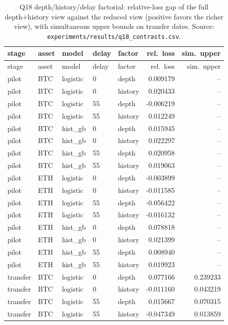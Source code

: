 \begin{longtable}{lllllrr}
\caption{Q18 depth/history/delay factorial: relative-loss gap of the full depth+history
view against the reduced view (positive favors the richer view), with simultaneous upper
bounds on transfer dates. Source: \texttt{experiments/results/q18\_contrasts.csv}.}
\label{tab:q18}\\
\toprule
stage & asset & model & delay & factor & rel.\ loss & sim.\ upper \\
\midrule
\endfirsthead
\toprule
stage & asset & model & delay & factor & rel.\ loss & sim.\ upper \\
\midrule
\endhead
\bottomrule
\endfoot
pilot & BTC & logistic & 0 & depth & 0.009179 & -- \\
pilot & BTC & logistic & 0 & history & 0.020433 & -- \\
pilot & BTC & logistic & 55 & depth & -0.006219 & -- \\
pilot & BTC & logistic & 55 & history & 0.012249 & -- \\
pilot & BTC & hist\_gb & 0 & depth & 0.015945 & -- \\
pilot & BTC & hist\_gb & 0 & history & 0.022297 & -- \\
pilot & BTC & hist\_gb & 55 & depth & 0.020958 & -- \\
pilot & BTC & hist\_gb & 55 & history & 0.019063 & -- \\
pilot & ETH & logistic & 0 & depth & -0.003899 & -- \\
pilot & ETH & logistic & 0 & history & -0.011585 & -- \\
pilot & ETH & logistic & 55 & depth & -0.056422 & -- \\
pilot & ETH & logistic & 55 & history & -0.016132 & -- \\
pilot & ETH & hist\_gb & 0 & depth & 0.078818 & -- \\
pilot & ETH & hist\_gb & 0 & history & 0.021399 & -- \\
pilot & ETH & hist\_gb & 55 & depth & 0.008940 & -- \\
pilot & ETH & hist\_gb & 55 & history & 0.019923 & -- \\
transfer & BTC & logistic & 0 & depth & 0.077166 & 0.239233 \\
transfer & BTC & logistic & 0 & history & -0.011160 & 0.043219 \\
transfer & BTC & logistic & 55 & depth & 0.015667 & 0.070315 \\
transfer & BTC & logistic & 55 & history & -0.047349 & 0.013859 \\

\end{longtable}
